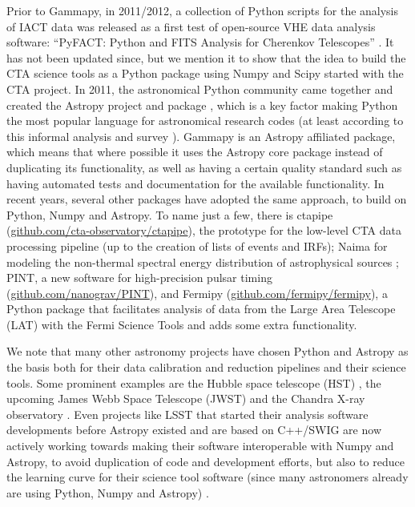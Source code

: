 \documentclass{PoS}
\newcommand{\urlCtaPipe}{\href{https://github.com/cta-observatory/ctapipe}{github.com/cta-observatory/ctapipe}}
\newcommand{\urlPint}{\href{https://github.com/nanograv/PINT}{github.com/nanograv/PINT}}
\newcommand{\urlFermipy}{\href{https://github.com/fermipy/fermipy}{github.com/fermipy/fermipy}}
\begin{document}
Prior to Gammapy, in 2011/2012, a collection of Python scripts for the analysis
of IACT data was released as a first test of open-source VHE data analysis
software: ``PyFACT: Python and FITS Analysis for Cherenkov Telescopes''
\cite{pyfact}. It has not been updated since, but we mention it to show that the
idea to build the CTA science tools as a Python package using Numpy and Scipy
started with the CTA project. In 2011, the astronomical Python community came
together and created the Astropy project and package \cite{astropy}, which is a
key factor making Python the most popular language for astronomical research
codes (at least according to this informal analysis \cite{perry} and survey
\cite{momcheva2015}). Gammapy is an Astropy affiliated package, which means that
where possible it uses the Astropy core package instead of duplicating its
functionality, as well as having a certain quality standard such as having
automated tests and documentation for the available functionality. In recent
years, several other packages have adopted the same approach, to build on
Python, Numpy and Astropy. To name just a few, there is ctapipe (\urlCtaPipe),
the prototype for the low-level CTA data processing pipeline (up to the creation
of lists of events and IRFs); Naima for modeling the non-thermal spectral energy
distribution of astrophysical sources \cite{naima}; PINT, a new software for
high-precision pulsar timing (\urlPint), and Fermipy (\urlFermipy), a Python
package that facilitates analysis of data from the Large Area Telescope (LAT)
with the Fermi Science Tools and adds some extra functionality.

We note that many other astronomy projects have chosen Python and Astropy as the
basis both for their data calibration and reduction pipelines and their science
tools. Some prominent examples are the Hubble space telescope (HST)
\cite{hubble}, the upcoming James Webb Space Telescope (JWST) \cite{jwst} and
the Chandra X-ray observatory \cite{sherpa2001, chandra}. Even projects like
LSST that started their analysis software developments before Astropy existed
and are based on C++/SWIG are now actively working towards making their software
interoperable with Numpy and Astropy, to avoid duplication of code and
development efforts, but also to reduce the learning curve for their science
tool software (since many astronomers already are using Python, Numpy and
Astropy) \cite{lsst}.

\end{document}

